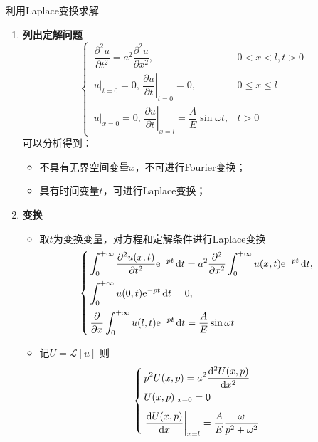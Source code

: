 \solve 利用Laplace变换求解
\begin{enumerate}
	\item \textbf{列出定解问题}
	\begin{equation}
		\begin{cases}
			\, \dfrac{\partial^2 u}{\partial t^2} = a^2 \dfrac{\partial^2 u}{\partial x^2} , & 0 < x< l,t>0\\[1em]
			\, u|_{t = 0} = 0, 	\,\left. \dfrac{\partial u}{\partial t}\right|_{t = 0} = 0, & 0 \le x \le l\\[1em]
			\, u|_{x = 0} = 0, 	\,\left. \dfrac{\partial u}{\partial t}\right|_{x = l} = \dfrac{A}{E}\sin \omega t, & t>0
		\end{cases}
	\end{equation}
	可以分析得到：
	\begin{itemize}
		\item 不具有无界空间变量$x$，不可进行Fourier变换；
		\item 具有时间变量$t$，可进行Laplace变换；
	\end{itemize}
	
	\item \textbf{变换}
	\begin{itemize}
		\item 取$t$为变换变量，对方程和定解条件进行Laplace变换
		\begin{equation}
			\begin{cases}
				\, \displaystyle \int_0^{+\infty} \dfrac{\partial^2 u(x,t)}{\partial t^2}{\rm{e}}^{-p t}\, {\rm{d}} t = a^2 \dfrac{\partial^2 }{\partial x^2} \int_0^{+\infty} u(x,t){\rm{e}}^{- p t}\, {\rm{d}} t,\\[1em]
				\, \displaystyle \int_0^{+\infty} u(0,t) {\rm{e}}^{-pt}\, {\rm{d}} t = 0,\\[1em]
				\, \displaystyle \dfrac{\partial }{\partial x}\int_0^{+\infty} u(l,t){\rm{e}}^{-pt}\, {\rm{d}} t = \dfrac{A}{E} \sin \omega t 
			\end{cases}
		\end{equation}
		
		\item 记$U = \mathcal{L}[u]$ 则
		\begin{equation}
			\begin{cases}
				\, \displaystyle p^2  U(x, p) = a^2 \dfrac{{\rm{d}}^2 U(x,p)}{{\rm{d}} x^2}\\[0.5em]
				\, \displaystyle U(x,p)|_{x = 0} = 0\\[0.7em]
				\, \displaystyle \left. \dfrac{{\rm{d}} U(x, p)}{{\rm{d}} x} \right|_{x = l} = \dfrac{A}{E} \dfrac{\omega}{p^2 + \omega^2}
			\end{cases}
			\label{有界弦受迫振动}
		\end{equation}
	\end{itemize}
	

\end{enumerate}
